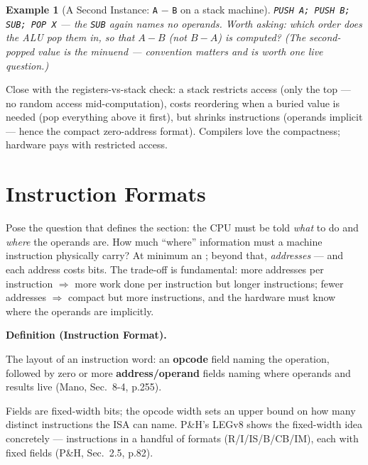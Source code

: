 \documentclass[11pt]{article}
\newtheorem{example}{Example}[section]
\newenvironment{definitionbox}[1]{%
  \par\noindent\textbf{Definition (#1).}\ \itshape
}{\par\vspace{0.3em}}
\begin{document}
\begin{example}[A Second Instance: \texttt{A} $-$ \texttt{B} on a stack machine]
\texttt{PUSH A; PUSH B; SUB; POP X} --- the \texttt{SUB} again names no operands. Worth asking: which order does the ALU pop them in, so that $A-B$ (not $B-A$) is computed? (The \emph{second}-popped value is the minuend --- convention matters and is worth one live question.)
\end{example}

Close with the registers-vs-stack check: a stack restricts access (only the top --- no random access mid-computation), costs reordering when a buried value is needed (pop everything above it first), but shrinks instructions (operands implicit --- hence the compact zero-address format). Compilers love the compactness; hardware pays with restricted access.

\section{Instruction Formats}

Pose the question that defines the section: the CPU must be told \emph{what} to do and \emph{where} the operands are. How much ``where'' information must a machine instruction physically carry? At minimum an ; beyond that, \emph{addresses} --- and each address costs bits. The trade-off is fundamental: more addresses per instruction $\Rightarrow$ more work done per instruction but longer instructions; fewer addresses $\Rightarrow$ compact but more instructions, and the hardware must know where the operands are implicitly.

\begin{definitionbox}{Instruction Format}
The layout of an instruction word: an \textbf{opcode} field naming the operation, followed by zero or more \textbf{address/operand} fields naming where operands and results live (Mano, Sec.~8-4, p.255).
\end{definitionbox}

Fields are fixed-width bits; the opcode width sets an upper bound on how many distinct instructions the ISA can name. P\&H's LEGv8 shows the fixed-width idea concretely --- instructions in a handful of formats (R/I/IS/B/CB/IM), each with fixed fields (P\&H, Sec.~2.5, p.82).
\end{document}
